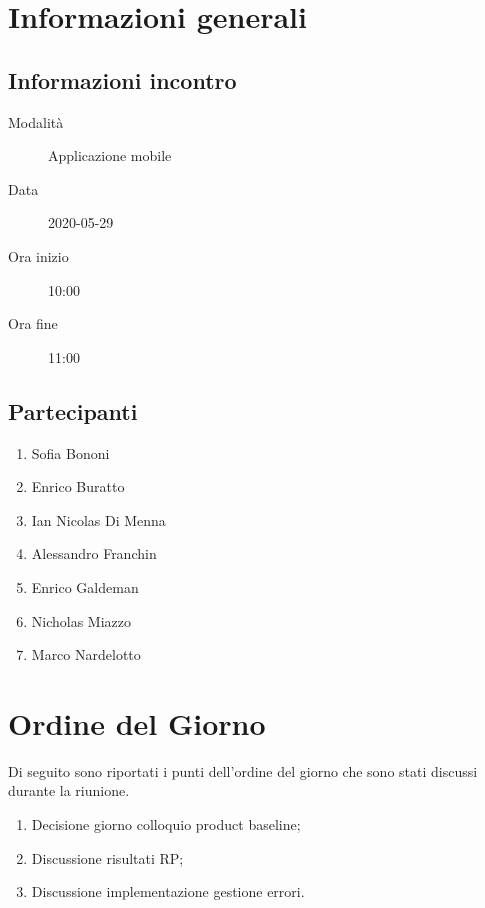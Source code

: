 \documentclass{article}
\begin{document}


\section{Informazioni generali}%
\label{sec:informazioni_generali}

\subsection{Informazioni incontro}%
\label{sub:informazioni_incontro}

\begin{description}
  \item[Modalità] Applicazione mobile 
  \item[Data] 2020-05-29
  \item[Ora inizio] 10:00
  \item[Ora fine] 11:00
\end{description}

\subsection{Partecipanti}%
\label{sub:partecipanti}

\begin{enumerate}
  \item Sofia Bononi
  \item Enrico Buratto
  \item Ian Nicolas Di Menna
  \item Alessandro Franchin
  \item Enrico Galdeman
  \item Nicholas Miazzo
  \item Marco Nardelotto
\end{enumerate}

\section{Ordine del Giorno}%
\label{ordine_del_giorno}
Di seguito sono riportati i punti dell'ordine del giorno che sono stati discussi durante la riunione.
\begin{enumerate}
  \item Decisione giorno colloquio product baseline;
  \item Discussione risultati RP;
  \item Discussione implementazione gestione errori.
\end{enumerate}
\end{document}
